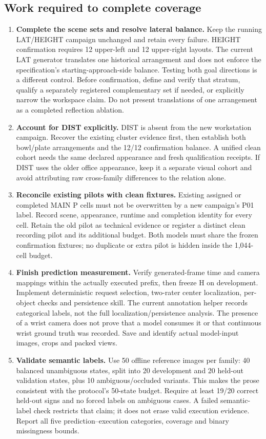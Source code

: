 \subsection{Work required to complete coverage}
\begin{enumerate}[leftmargin=*]
\item \textbf{Complete the scene sets and resolve lateral balance.} Keep the running LAT/HEIGHT campaign unchanged and retain every failure. HEIGHT confirmation requires 12 upper-left and 12 upper-right layouts. The current LAT generator translates one historical arrangement and does not enforce the specification's starting-approach-side balance. Testing both goal directions is a different control. Before confirmation, define and verify that stratum, qualify a separately registered complementary set if needed, or explicitly narrow the workspace claim. Do not present translations of one arrangement as a completed reflection ablation.
\item \textbf{Account for DIST explicitly.} DIST is absent from the new workstation campaign. Recover the existing cluster evidence first, then establish both bowl/plate arrangements and the 12/12 confirmation balance. A unified clean cohort needs the same declared appearance and fresh qualification receipts. If DIST uses the older office appearance, keep it a separate visual cohort and avoid attributing raw cross-family differences to the relation alone.
\item \textbf{Reconcile existing pilots with clean fixtures.} Existing assigned or completed MAIN P cells must not be overwritten by a new campaign's P01 label. Record scene, appearance, runtime and completion identity for every cell. Retain the old pilot as technical evidence or register a distinct clean recording pilot and its additional budget. Both models must share the frozen confirmation fixtures; no duplicate or extra pilot is hidden inside the 1,044-cell budget.
\item \textbf{Finish prediction measurement.} Verify generated-frame time and camera mappings within the actually executed prefix, then freeze H on development. Implement deterministic request selection, two-rater center localization, per-object checks and persistence skill. The current annotation helper records categorical labels, not the full localization/persistence analysis. The presence of a wrist camera does not prove that a model consumes it or that continuous wrist ground truth was recorded. Save and identify actual model-input images, crops and packed views.
\item \textbf{Validate semantic labels.} Use 50 offline reference images per family: 40 balanced unambiguous states, split into 20 development and 20 held-out validation states, plus 10 ambiguous/occluded variants. This makes the prose consistent with the protocol's 50-state budget. Require at least 19/20 correct held-out signs and no forced labels on ambiguous cases. A failed semantic-label check restricts that claim; it does not erase valid execution evidence. Report all five prediction--execution categories, coverage and binary missingness bounds.

\end{enumerate}
